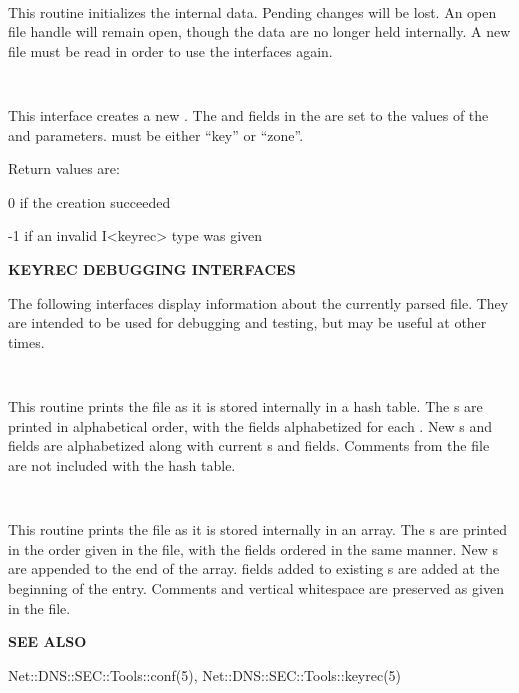 \begin{description}

\item {}\verb" "

This routine initializes the internal  data.  Pending changes
will be lost.  An open  file handle will remain open, though
the data are no longer held internally.  A new  file must be
read in order to use the  interfaces again.

\item {}\verb" "

This interface creates a new .  The  and
 fields in the  are set to the values of the
 and  parameters.   must be either
``key'' or ``zone''.

Return values are:

\begin{description}
\item 0 if the creation succeeded
\item -1 if an invalid I<keyrec> type was given
\end{description}

\end{description}

{\bf KEYREC DEBUGGING INTERFACES}

The following interfaces display information about the currently parsed
 file.  They are intended to be used for debugging and testing,
but may be useful at other times.

\begin{description}

\item {}\verb" "

This routine prints the  file as it is stored internally in a
hash table.  The s are printed in alphabetical order, with the
fields alphabetized for each .  New s and
 fields are alphabetized along with current s
and fields.  Comments from the  file are not included with the
hash table.

\item {}\verb" "

This routine prints the  file as it is stored internally in
an array.  The s are printed in the order given in the file,
with the fields ordered in the same manner.  New s are
appended to the end of the array.   fields added to existing
s are added at the beginning of the  entry.
Comments and vertical whitespace are preserved as given in the
 file.

\end{description}

{\bf SEE ALSO}

Net::DNS::SEC::Tools::conf(5),
Net::DNS::SEC::Tools::keyrec(5)


